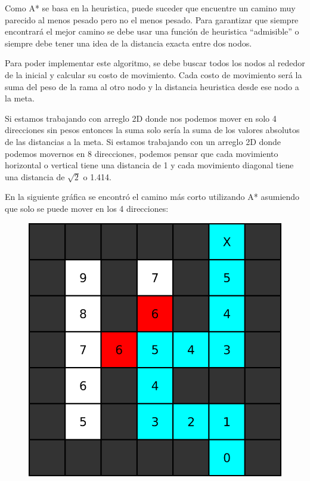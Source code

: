 \documentclass{article}
\begin{document}
Como A* se basa en la heuristica, puede suceder que encuentre un camino muy parecido al menos pesado pero no el menos pesado. Para garantizar que siempre encontrará el mejor camino se debe usar una función de heuristica ``admisible'' o siempre debe tener una idea de la distancia exacta entre dos nodos.

Para poder implementar este algoritmo, se debe buscar todos los nodos al rededor de la inicial y calcular su costo de movimiento. Cada costo de movimiento será la suma del peso de la rama al otro nodo y la distancia heuristica desde ese nodo a la meta.

Si estamos trabajando con arreglo 2D donde nos podemos mover en solo 4 direcciones sin pesos entonces la suma solo sería la suma de los valores absolutos de las distancias a la meta. Si estamos trabajando con un arreglo 2D donde podemos movernos en 8 direcciones, podemos pensar que cada movimiento horizontal o vertical tiene una distancia de 1 y cada movimiento diagonal tiene una distancia de $\sqrt{2}$ o 1.414.

En la siguiente gráfica se encontró el camino más corto utilizando A* asumiendo que solo se puede mover en los 4 direcciones:

\begin{figure}[H]
    \centering
    \includegraphics[width=0.32\paperwidth]{astrella}
\end{figure}
\end{document}
